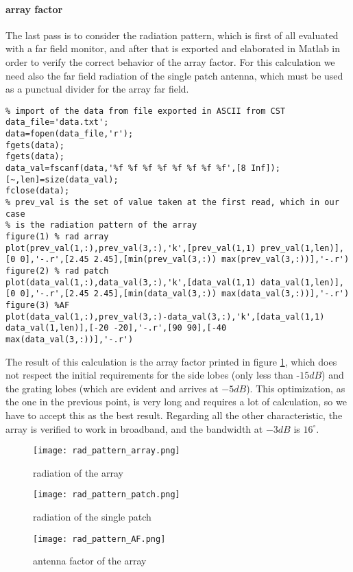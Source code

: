 \paragraph{array factor} The last pass is to consider the radiation pattern, which is first of all evaluated with a far field monitor, and after that is exported and elaborated in Matlab in order to verify the correct behavior of the array factor. For this calculation we need also the far field radiation of the single patch antenna, which must be used as a punctual divider for the array far field.
\begin{lstlisting}
% import of the data from file exported in ASCII from CST
data_file='data.txt';
data=fopen(data_file,'r');
fgets(data);
fgets(data);
data_val=fscanf(data,'%f %f %f %f %f %f %f %f',[8 Inf]);
[~,len]=size(data_val);
fclose(data);
% prev_val is the set of value taken at the first read, which in our case
% is the radiation pattern of the array
figure(1) % rad array
plot(prev_val(1,:),prev_val(3,:),'k',[prev_val(1,1) prev_val(1,len)],[0 0],'-.r',[2.45 2.45],[min(prev_val(3,:)) max(prev_val(3,:))],'-.r')
figure(2) % rad patch
plot(data_val(1,:),data_val(3,:),'k',[data_val(1,1) data_val(1,len)],[0 0],'-.r',[2.45 2.45],[min(data_val(3,:)) max(data_val(3,:))],'-.r')
figure(3) %AF
plot(data_val(1,:),prev_val(3,:)-data_val(3,:),'k',[data_val(1,1) data_val(1,len)],[-20 -20],'-.r',[90 90],[-40 max(data_val(3,:))],'-.r')
\end{lstlisting}
The result of this calculation is the array factor printed in figure \ref{rad_pattern_AF}, which does not respect the initial requirements for the side lobes (only less than -$15dB$) and the grating lobes (which are evident and arrives at $-5dB$). This optimization, as the one in the previous point, is very long and requires a lot of calculation, so we have to accept this as the best result. Regarding all the other characteristic, the array is verified to work in broadband, and the bandwidth at $-3dB$ is $16^{\circ}$.
\begin{figure}[H]
	\centering
	\texttt{[image: rad\_pattern\_array.png]}
	\caption{radiation of the array}
\end{figure}
\begin{figure}[H]
	\centering
	\texttt{[image: rad\_pattern\_patch.png]}
	\caption{radiation of the single patch}
\end{figure}
\begin{figure}[H]
	\centering
	\texttt{[image: rad\_pattern\_AF.png]}
	\caption{antenna factor of the array}
	\label{rad_pattern_AF}
\end{figure}